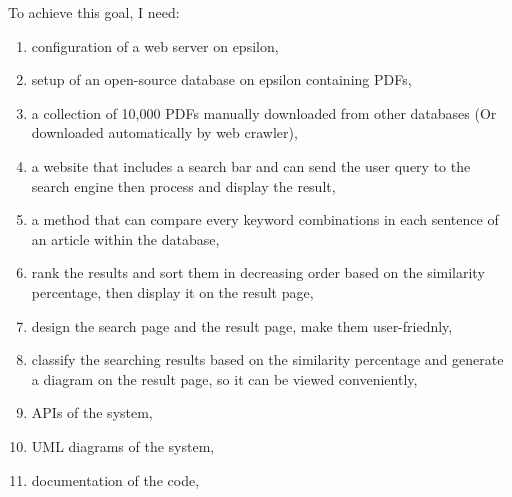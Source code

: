 	To achieve this goal, I need:
\begin{enumerate}
  \item configuration of a web server on epsilon,
  \item setup of an open-source database on epsilon containing PDFs,
  \item a collection of 10,000 PDFs manually downloaded from other databases (Or downloaded automatically by web crawler),
  \item a website that includes a search bar and can send the user query to the search engine then process and display the result,
  \item a method that can compare every keyword combinations in each sentence of an article within the database,
  \item rank the results and sort them in decreasing order based on the similarity percentage, then display it on the result page,
  \item design the search page and the result page, make them  user-friednly,
  \item classify the searching results based on the similarity percentage and generate a diagram on the result page, so it can be viewed conveniently,
  \item APIs of the system,
  \item UML diagrams of the system,
  \item documentation of the code, 
\end{enumerate}
